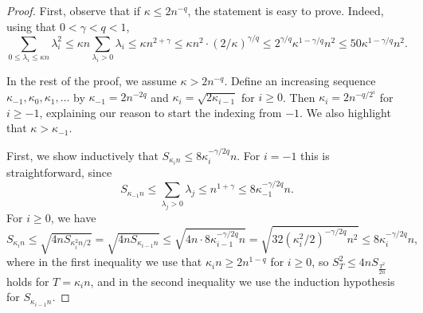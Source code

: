 \documentclass[11pt]{article}
\theoremstyle{plain}
\theoremstyle{definition}
\begin{document}
\begin{proof}
First, observe that if $\kappa\leq 2n^{-q}$, the statement is easy to prove. 
Indeed, using that $0 < \gamma < q < 1$, 
$$\sum_{0\leq \lambda_i
    \leq \kappa n}\lambda_i^2
    \leq \kappa n\sum_{\lambda_i>0}\lambda_i
    \leq \kappa n^{2+\gamma}
    \leq \kappa n^2\cdot (2/\kappa)^{\gamma/q}
    \leq 2^{\gamma/q}\kappa^{1-\gamma/q}n^2
    \leq 50\kappa^{1-\gamma/q}n^2.$$

In the rest of the proof, we assume $\kappa>2n^{-q}$. 
Define an increasing sequence $\kappa_{-1}, \kappa_0, \kappa_1, \dots$ by $\kappa_{-1}=2n^{-2q}$ and $\kappa_{i}=\sqrt{2\kappa_{i-1}}$ for $i\geq 0$. Then $\kappa_i=2n^{-q/2^i}$ for $i\geq -1$, explaining our reason to start the indexing from $-1$. We also highlight that $\kappa>\kappa_{-1}$.

First, we show inductively that $S_{\kappa_i n}\leq 8\kappa_i^{-\gamma/2q}n$. 
For $i=-1$ this is straightforward, since $$S_{\kappa_{-1}n}\leq \sum_{\lambda_j>0}\lambda_j\leq n^{1+\gamma}\leq 8\kappa_{-1}^{-\gamma/2q}n.$$
For $i\geq 0$, we have \[S_{\kappa_i n}\leq \sqrt{4nS_{\kappa_i^2n/2}}=\sqrt{4nS_{\kappa_{i-1}n}}\leq \sqrt{4n\cdot 8\kappa_{i-1}^{-\gamma/2q}n}=\sqrt{32(\kappa_i^2/2)^{-\gamma/2q}n^2}\leq 8\kappa_i^{-\gamma/2q}n,\]
where in the first inequality we use that $\kappa_i n\geq 2n^{1-q}$ for $i\geq 0$, so $S_T^2\leq 4nS_{\frac{T^2}{2n}}$ holds for $T=\kappa_i n$,  and in the second inequality we use the induction hypothesis for $S_{\kappa_{i-1}n}$.


\end{proof}
\end{document}
